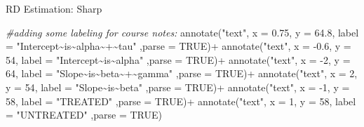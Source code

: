 \documentclass[
  ignorenonframetext,
]{beamer}
\newenvironment{Shaded}{\begin{snugshade}}{\end{snugshade}}
\newcommand{\AttributeTok}[1]{\textcolor[rgb]{0.77,0.63,0.00}{#1}}
\newcommand{\CommentTok}[1]{\textcolor[rgb]{0.56,0.35,0.01}{\textit{#1}}}
\newcommand{\ConstantTok}[1]{\textcolor[rgb]{0.00,0.00,0.00}{#1}}
\newcommand{\DecValTok}[1]{\textcolor[rgb]{0.00,0.00,0.81}{#1}}
\newcommand{\FloatTok}[1]{\textcolor[rgb]{0.00,0.00,0.81}{#1}}
\newcommand{\FunctionTok}[1]{\textcolor[rgb]{0.00,0.00,0.00}{#1}}
\newcommand{\NormalTok}[1]{#1}
\newcommand{\SpecialCharTok}[1]{\textcolor[rgb]{0.00,0.00,0.00}{#1}}
\newcommand{\StringTok}[1]{\textcolor[rgb]{0.31,0.60,0.02}{#1}}
\begin{document}
\begin{frame}[fragile]{RD Estimation: Sharp}
\begin{Shaded}
\begin{Highlighting}[]
          \CommentTok{\#adding some labeling for course notes:}
          \FunctionTok{annotate}\NormalTok{(}\StringTok{"text"}\NormalTok{, }\AttributeTok{x =} \FloatTok{0.75}\NormalTok{, }\AttributeTok{y =} \FloatTok{64.8}\NormalTok{,}
                   \AttributeTok{label =} \StringTok{"Intercept\textasciitilde{}is\textasciitilde{}alpha\textasciitilde{}+\textasciitilde{}tau"}\NormalTok{ ,}\AttributeTok{parse =} \ConstantTok{TRUE}\NormalTok{)}\SpecialCharTok{+}
          \FunctionTok{annotate}\NormalTok{(}\StringTok{"text"}\NormalTok{, }\AttributeTok{x =} \SpecialCharTok{{-}}\FloatTok{0.6}\NormalTok{, }\AttributeTok{y =} \DecValTok{54}\NormalTok{, }
                   \AttributeTok{label =} \StringTok{"Intercept\textasciitilde{}is\textasciitilde{}alpha"}\NormalTok{ ,}\AttributeTok{parse =} \ConstantTok{TRUE}\NormalTok{)}\SpecialCharTok{+}
          \FunctionTok{annotate}\NormalTok{(}\StringTok{"text"}\NormalTok{, }\AttributeTok{x =} \SpecialCharTok{{-}}\DecValTok{2}\NormalTok{, }\AttributeTok{y =} \DecValTok{64}\NormalTok{,}
                   \AttributeTok{label =} \StringTok{"Slope\textasciitilde{}is\textasciitilde{}beta\textasciitilde{}+\textasciitilde{}gamma"}\NormalTok{ ,}\AttributeTok{parse =} \ConstantTok{TRUE}\NormalTok{)}\SpecialCharTok{+}
          \FunctionTok{annotate}\NormalTok{(}\StringTok{"text"}\NormalTok{, }\AttributeTok{x =} \DecValTok{2}\NormalTok{, }\AttributeTok{y =} \DecValTok{54}\NormalTok{, }
                   \AttributeTok{label =} \StringTok{"Slope\textasciitilde{}is\textasciitilde{}beta"}\NormalTok{ ,}\AttributeTok{parse =} \ConstantTok{TRUE}\NormalTok{)}\SpecialCharTok{+}
          \FunctionTok{annotate}\NormalTok{(}\StringTok{"text"}\NormalTok{, }\AttributeTok{x =} \SpecialCharTok{{-}}\DecValTok{1}\NormalTok{, }\AttributeTok{y =} \DecValTok{58}\NormalTok{, }
                   \AttributeTok{label =} \StringTok{"TREATED"}\NormalTok{ ,}\AttributeTok{parse =} \ConstantTok{TRUE}\NormalTok{)}\SpecialCharTok{+}
          \FunctionTok{annotate}\NormalTok{(}\StringTok{"text"}\NormalTok{, }\AttributeTok{x =} \DecValTok{1}\NormalTok{, }\AttributeTok{y =} \DecValTok{58}\NormalTok{, }
                   \AttributeTok{label =} \StringTok{"UNTREATED"}\NormalTok{ ,}\AttributeTok{parse =} \ConstantTok{TRUE}\NormalTok{) }
\end{Highlighting}
\end{Shaded}
\end{frame}
\end{document}
